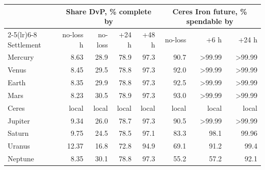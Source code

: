 \par\noindent
\begin{tabular}{lrrrrrrr}
\toprule
 & \multicolumn{4}{c}{Share DvP, \% complete by} & \multicolumn{3}{c}{Ceres Iron future, \% spendable by} \\
\cmidrule(lr){2-5}\cmidrule(lr){6-8}
Settlement & no-loss h & no-loss & +24 h & +48 h & no-loss & +6 h & +24 h\\
\midrule
Mercury & 8.63 & 28.9 & 78.9 & 97.3 & 90.7 & >99.99 & >99.99\\
Venus & 8.45 & 29.5 & 78.8 & 97.3 & 92.0 & >99.99 & >99.99\\
Earth & 8.35 & 29.9 & 78.8 & 97.3 & 92.5 & >99.99 & >99.99\\
Mars & 8.23 & 30.5 & 78.9 & 97.3 & 93.0 & >99.99 & >99.99\\
Ceres & local & local & local & local & local & local & local\\
Jupiter & 9.34 & 26.0 & 78.7 & 97.3 & 90.5 & >99.99 & >99.99\\
Saturn & 9.75 & 24.5 & 78.5 & 97.1 & 83.3 & 98.1 & 99.96\\
Uranus & 12.37 & 16.8 & 72.8 & 94.9 & 69.1 & 91.2 & 99.4\\
Neptune & 8.35 & 30.1 & 78.8 & 97.3 & 55.2 & 57.2 & 92.1\\
\bottomrule
\end{tabular}\par
